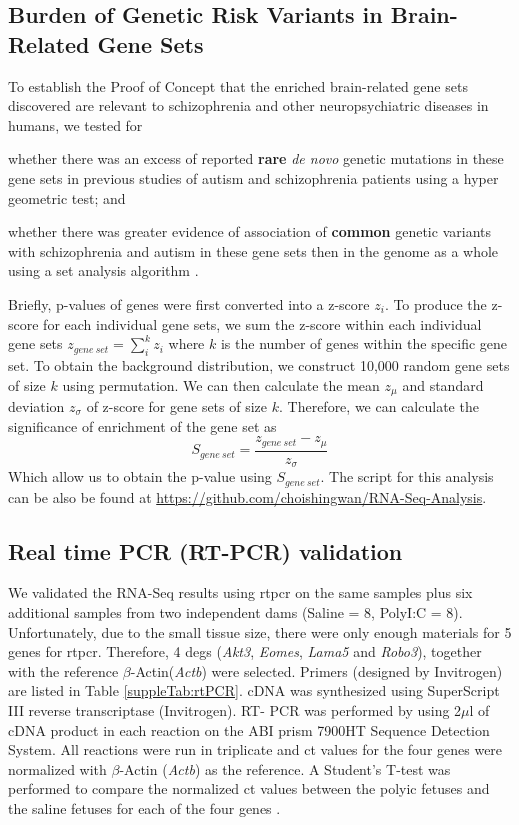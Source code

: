 \subsection{Burden of Genetic Risk Variants in Brain-Related Gene Sets}
To establish the Proof of Concept that the enriched brain-related gene sets discovered are relevant to schizophrenia and other neuropsychiatric diseases in humans, we tested for 
\begin{enumerate*}[label=\roman*)]
	\item whether there was an excess of reported \textbf{rare} \textit{de novo} genetic mutations in these gene sets in previous studies of autism and schizophrenia patients \citep{Fromer2014,ORoak2012,Sanders2012,Neale2012} using a hyper geometric test; and
	\item whether there was greater evidence of association of \textbf{common} genetic variants with schizophrenia \citep{Ripke2013} and autism \citep{Anney2010a} in these gene sets then in the genome as a whole using a set analysis algorithm \citep{Ideker2002}. 
\end{enumerate*}
Briefly, p-values of genes were first converted into a z-score $z_i$. 
To produce the z-score for each individual gene sets, we sum the z-score within each individual gene sets $z_{gene\ set} = \sum_i^kz_i$ where $k$ is the number of genes within the specific gene set. 
To obtain the background distribution, we construct 10,000 random gene sets of size $k$ using permutation. 
We can then calculate the mean $z_\mu$ and standard deviation $z_\sigma$ of z-score for gene sets of size $k$.
Therefore, we can calculate the significance of enrichment of the gene set as
$$
S_{gene\ set}=\frac{z_{gene\ set}-z_\mu}{z_\sigma}
$$
Which allow us to obtain the p-value using $S_{gene\ set}$. 
The script for this analysis can be also be found at \url{https://github.com/choishingwan/RNA-Seq-Analysis}. 


\subsection{Real time PCR (RT-PCR) validation}
We validated the RNA-Seq results using \gls{rtpcr} on the same samples plus six additional samples from two independent dams (Saline = 8, PolyI:C = 8).
Unfortunately, due to the small tissue size, there were only enough materials for 5 genes for \gls{rtpcr}. 
Therefore, 4 \glspl{deg} (\textit{Akt3}, \textit{Eomes}, \textit{Lama5} and \textit{Robo3}), together with the reference $\beta$-Actin(\textit{Actb}) were selected. 
Primers (designed by Invitrogen) are listed in Table \cref{suppleTab:rtPCR}. 
cDNA was synthesized using SuperScript III reverse transcriptase (Invitrogen). 
RT- PCR was performed by using 2$\mu$l of cDNA product in each reaction on the ABI prism 7900HT Sequence Detection System.
All reactions were run in triplicate and \gls{ct} values for the four genes were normalized with $\beta$-Actin (\textit{Actb}) as the reference. 
A Student’s T-test was performed to compare the normalized \gls{ct} values between the \gls{polyic} fetuses and the saline fetuses for each of the four genes \citep{Yuan2006}.
